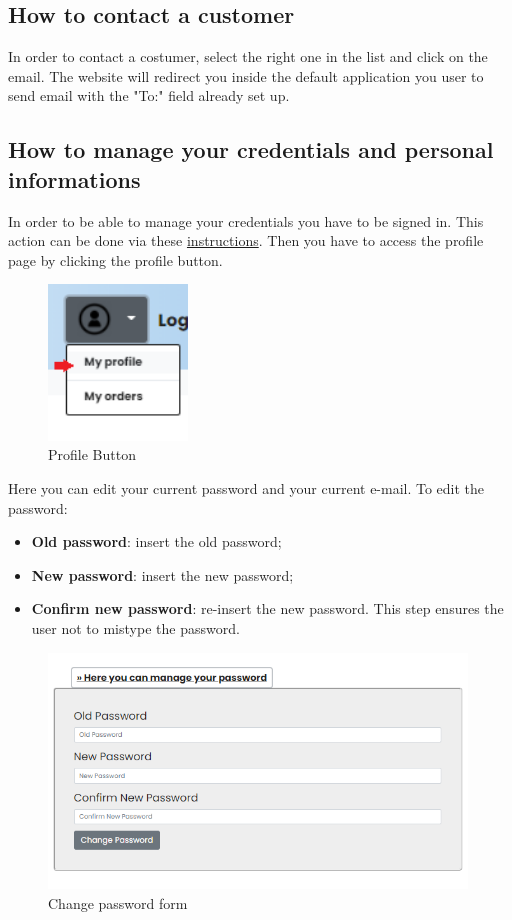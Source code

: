 \subsection{How to contact a customer}\label{_contactCustomer}
In order to contact a costumer, select the right one in the list and click on the email. The website will redirect you inside the default application you user to send email with the "To:" field already set up.

\subsection{How to manage your credentials and personal informations} \label{_credentials}
In order to be able to manage your credentials you have to be signed in. This action can be done via these \hyperref[_signin]{instructions}.
Then you have to access the profile page by clicking the profile button.
\begin{figure}[H]
    \centering
    \includegraphics[width=10em]{res/images/cliente/profileaccount.png}
    \caption{Profile Button}
\end{figure}

Here you can edit your current password and your current e-mail.
To edit the password:
\begin{itemize} 
    \item \textbf{Old password}: insert the old password;
    \item \textbf{New password}: insert the new password; 
    \item \textbf{Confirm new password}: re-insert the new password. This step ensures the user not to  mistype the password.
\end{itemize}

\begin{figure}[H]
    \centering
    \includegraphics[width=30em]{res/images/cliente/credentialpwd.png}
    \caption{Change password form}
\end{figure}

